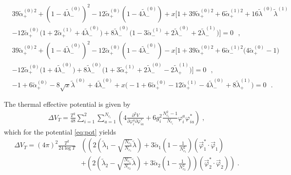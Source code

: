 \begin{equation}\label{eq:NLORGeqp}
    \begin{split}
        &39\tilde\alpha_+^{(0)2}+(1-4\tilde\lambda_-^{(0)})^2-12\tilde\alpha_+^{(0)}(1-4\tilde\lambda_-^{(0)})+x\Big[1+39\tilde\alpha_+^{(0)2}+6\tilde\alpha_+^{(1)2}+16\tilde\lambda^{(0)}\tilde\lambda^{(1)}\\
        &-12\tilde\alpha_+^{(0)}\Big(1+2\tilde\alpha_+^{(1)}+4\tilde\lambda_-^{(0)}\Big)+8\tilde\lambda_-^{(0)}\Big(1-3\tilde\alpha_-^{(1)}+2\tilde\lambda_-^{(0)}+2\tilde\lambda_-^{(1)}\Big)\Big]=0 \ \ \ ,
    \end{split}
\end{equation}
\begin{equation}\label{eq:NLORGeqm}
    \begin{split}
        &39\tilde\alpha_+^{(0)2}+(1-4\tilde\lambda_-^{(0)})^2-12\tilde\alpha_+^{(0)}(1-4\tilde\lambda_-^{(0)})-x\Big[1+39\tilde\alpha_+^{(0)2}+6\tilde\alpha_-^{(1)2}\Big(4\tilde\alpha_+^{(0)}-1\Big)\\
        &-12\tilde\alpha_+^{(0)}\Big(1+4\tilde\lambda_-^{(0)}\Big)+8\tilde\lambda_-^{(0)}\Big(1+3\tilde\alpha_+^{(1)}+2\tilde\lambda_-^{(0)}-2\tilde\lambda_+^{(1)}\Big)\Big]=0 \ \ \ ,
    \end{split}
\end{equation}
\begin{equation}\label{eq:NLORGeq3}
    \begin{split}
        &-1+6\tilde\alpha_+^{(0)}-8\sqrt{x}\tilde\lambda^{(0)}+4\tilde\lambda_-^{(0)}+x\Big(-1+6\tilde\alpha_+^{(0)}-12\tilde\alpha_+^{(1)}-4\tilde\lambda_-^{(0)}+8\tilde\lambda_+^{(1)}\Big)=0 \ \ \ .
    \end{split}
\end{equation}


\noindent
The thermal effective potential is given by
\begin{align}
\Delta V_T=
\frac{T^2}{48}\sum_{i=1}^2\sum_{a=1}^{N_{c_i}}\left(4\frac{\partial^2V}{\partial\varphi_i^a\partial\varphi_{ia}^*}
+6g_i^2\frac{N_{c_i}^2-1}{N_{c_i}}\varphi_i^a\varphi_{ia}^*\right)\;,
\end{align}
which for the potential \eqref{eq:pot} yields
\begin{align}
\Delta V_T=
(4\pi)^2\frac{T^2}{24\log{T}}&\left(\left(2\left(\tilde\lambda_1-\sqrt{\frac{N_{c_2}}{N_{c_1}}}\tilde\lambda\right)
+3\tilde\alpha_1 \left(1 - \frac{1}{N_{c_1}^2} \right)
\left(\vec{\varphi}_1^*\cdot\vec{\varphi}_1\right)\right.\right.\nonumber\\
&\left.+\left(2\left(\tilde\lambda_2-\sqrt{\frac{N_{c_1}}{N_{c_2}}}\tilde\lambda\right)+3\tilde\alpha_2 \left(1 - \frac{1}{N_{c_2}^2} \right)\right)
\left(\vec{\varphi}_2^*\cdot\vec{\varphi}_2\right)\right)\;.
\end{align}

